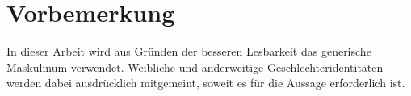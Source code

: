 



\section*{Vorbemerkung}

In dieser Arbeit wird aus Gründen der besseren Lesbarkeit das generische Maskulinum verwendet. Weibliche und anderweitige Geschlechteridentitäten werden dabei ausdrücklich mitgemeint, soweit es für die Aussage erforderlich ist.

\newpage
\fancyhead[R]{\leftmark}